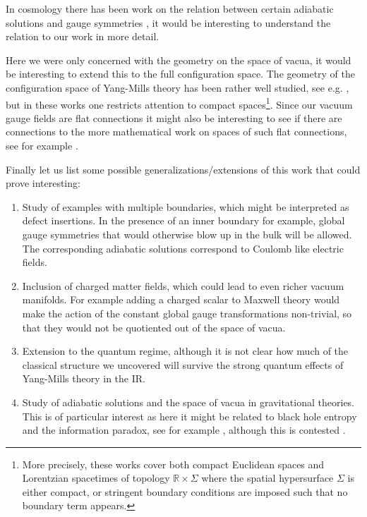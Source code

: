 \documentclass[11pt,a4paper]{article}
\begin{document}
    In cosmology there has been work on the relation between certain adiabatic solutions and gauge symmetries \cite{Weinberg:2003sw, Hinterbichler:2013dpa, Mirbabayi:2016xvc}, it would be interesting to understand the relation to our work in more detail.
    
    Here we were only concerned with the geometry on the space of vacua, it would be interesting to extend this to the full configuration space. The geometry of the configuration space of Yang-Mills theory has been rather well studied, see e.g. \cite{Narasimhan:1979kf, Babelon:1980uj, Grabiak:1986si, Fuchs:1994zv, Orland:1996hm}, but in these works one restricts attention to compact spaces\footnote{More precisely, these works cover both compact Euclidean spaces and Lorentzian spacetimes of topology $\mathbb{R}\times\Sigma$ where the spatial hypersurface $\Sigma$ is either compact, or stringent boundary conditions are imposed such that no boundary term appears.}. Since our vacuum gauge fields are flat connections it might also be interesting to see if there are connections to the more mathematical work on spaces of such flat connections, see for example \cite{salamon1998notes}.
    
    Finally let us list some possible generalizations/extensions of this work that could prove interesting:
    \begin{enumerate}
    	\item Study of examples with multiple boundaries, which might be interpreted as defect insertions.  In the presence of an inner boundary for example, global gauge symmetries that would otherwise blow up in the bulk will be allowed. The corresponding adiabatic solutions  correspond to Coulomb like electric fields.
    	\item Inclusion of charged matter fields, which could lead to even richer vacuum manifolds. For example adding a charged scalar to Maxwell theory would make the action of the constant global gauge transformations non-trivial, so that they would not be quotiented out of the space of vacua.
    	\item Extension to the quantum regime, although it is not clear how much of the classical structure we uncovered will survive the strong quantum effects of Yang-Mills theory in the IR.
    	\item Study of adiabatic solutions and the space of vacua in gravitational theories. This is of particular interest as here it might be related to black hole entropy and the information paradox, see for example \cite{Hawking:2016msc,Afshar:2016uax}, although this is contested \cite{Bousso:2017dny, Bousso:2017rsx}.
    \end{enumerate}
   
\end{document}
